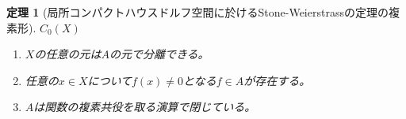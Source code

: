 \documentclass{jsarticle}
\newtheorem{thm}{定理}
\begin{document}
\begin{thm}[局所コンパクトハウスドルフ空間に於けるStone-Weierstrassの定理の複素形]$C_0(X)$
  \begin{enumerate}
   \item $X$の任意の元は$A$の元で分離できる。
   \item 任意の$x\in X$について$f(x)\neq 0$となる$f\in A$が存在する。
   \item $A$は関数の複素共役を取る演算で閉じている。
  \end{enumerate}
\end{thm}
\end{document}
